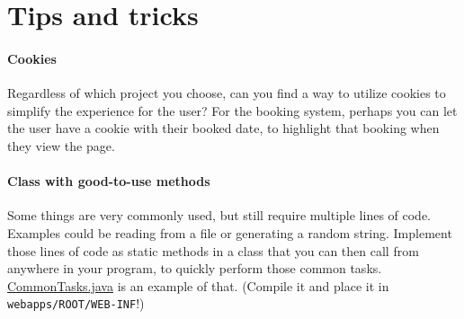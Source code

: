 \documentclass[a4paper, english]{article}
\begin{document}
    \section*{Tips and tricks}
        \paragraph{Cookies} Regardless of which project you choose, can you find a way to utilize cookies to simplify the experience for the user? For the booking system, perhaps you can let the user have a cookie with their booked date, to highlight that booking when they view the page.

        \paragraph{Class with good-to-use methods} Some things are very commonly used, but still require multiple lines of code. Examples could be reading from a file or generating a random string. Implement those lines of code as static methods in a class that you can then call from anywhere in your program, to quickly perform those common tasks. \href{https://klistra.in/UvlLVbb5}{CommonTasks.java} is an example of that. (Compile it and place it in \texttt{webapps/ROOT/WEB-INF}!)
\end{document}
